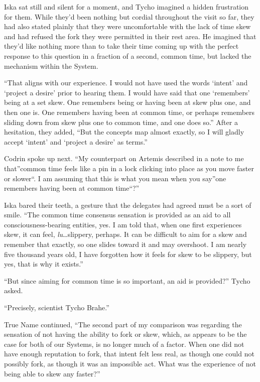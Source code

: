 Iska sat still and silent for a moment, and Tycho imagined a hidden frustration for them. While they'd been nothing but cordial throughout the visit so far, they had also stated plainly that they were uncomfortable with the lack of time skew and had refused the fork they were permitted in their rest area. He imagined that they'd like nothing more than to take their time coming up with the perfect response to this question in a fraction of a second, common time, but lacked the mechanism within the System.

``That aligns with our experience. I would not have used the words `intent' and `project a desire' prior to hearing them. I would have said that one `remembers' being at a set skew. One remembers being or having been at skew plus one, and then one is. One remembers having been at common time, or perhaps remembers sliding down from skew plus one to common time, and one does so.'' After a hesitation, they added, ``But the concepts map almost exactly, so I will gladly accept `intent' and `project a desire' as terms.''

Codrin spoke up next. ``My counterpart on Artemis described in a note to me that''common time feels like a pin in a lock clicking into place as you move faster or slower``. I am assuming that this is what you mean when you say''one remembers having been at common time``?''

Iska bared their teeth, a gesture that the delegates had agreed must be a sort of smile. ``The common time consensus sensation is provided as an aid to all consciousness-bearing entities, yes. I am told that, when one first experiences skew, it can feel, \emph{lu}\ldots slippery, perhaps. It can be difficult to aim for a skew and remember that exactly, so one slides toward it and may overshoot. I am nearly five thousand years old, I have forgotten how it feels for skew to be slippery, but yes, that is why it exists.''

``But since aiming for common time is so important, an aid is provided?'' Tycho asked.

``Precisely, scientist Tycho Brahe.''

True Name continued, ``The second part of my comparison was regarding the sensation of not having the ability to fork or skew, which, as appears to be the case for both of our Systems, is no longer much of a factor. When one did not have enough reputation to fork, that intent felt less real, as though one could not possibly fork, as though it was an impossible act. What was the experience of not being able to skew any faster?''

